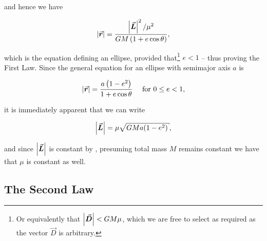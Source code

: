 and hence we have

\begin{tcolorbox}[enhanced,title={Kepler's First Law}]
    \begin{equation}
        \abs{\vec{r}}=\frac{\abs{\vec{L}}^2 / \mu^2}{GM\pqty{1+e\cos\theta}},
        \label{eq:keplers_first_law}
    \end{equation}
\end{tcolorbox}

which is the equation defining an ellipse, provided that\footnote{Or equivalently that $\abs{\vec{D}}<GM\mu$, which we are free to select as required as the vector $\vec{D}$ is arbitrary.} $e<1$ -- thus proving the First Law. Since the general equation for an ellipse with semimajor axis $a$ is

\begin{equation}
    \abs{\vec{r}} = \frac{a\pqty{1-e^2}}{1+e\cos\theta}\quad\text{ for } 0 \leq e < 1,
\end{equation}

it is immediately apparent that we can write

\begin{equation}
    \abs{\vec{L}} = \mu\sqrt{GMa(1-e^2)},\label{eq:angular_momentum_elliptical_orbit}
\end{equation}

and since $\abs{\vec{L}}$ is constant by , presuming total mass $M$ remains constant we have that $\mu$ is constant as well.

\subsection{The Second Law}


